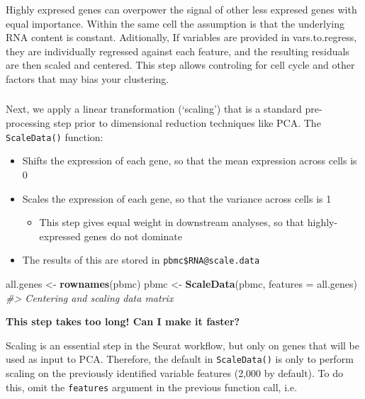 \documentclass[
]{book}
\newenvironment{Shaded}{\begin{snugshade}}{\end{snugshade}}
\newcommand{\AttributeTok}[1]{\textcolor[rgb]{0.13,0.29,0.53}{#1}}
\newcommand{\CommentTok}[1]{\textcolor[rgb]{0.56,0.35,0.01}{\textit{#1}}}
\newcommand{\FunctionTok}[1]{\textcolor[rgb]{0.13,0.29,0.53}{\textbf{#1}}}
\newcommand{\NormalTok}[1]{#1}
\newcommand{\OtherTok}[1]{\textcolor[rgb]{0.56,0.35,0.01}{#1}}
\providecommand{\tightlist}{%
  \setlength{\itemsep}{0pt}\setlength{\parskip}{0pt}}
\begin{document}
Highly expresed genes can overpower the signal of other less expresed genes with equal importance. Within the same cell the assumption is that the underlying RNA content is constant. Aditionally, If variables are provided in vars.to.regress, they are individually regressed against each feature, and the resulting residuals are then scaled and centered.
This step allows controling for cell cycle and other factors that may bias your clustering.

\subsubsection*{}\label{section-5}

Next, we apply a linear transformation (`scaling') that is a standard pre-processing step prior to dimensional reduction techniques like PCA. The \texttt{ScaleData()} function:

\begin{itemize}
\tightlist
\item
  Shifts the expression of each gene, so that the mean expression across cells is 0
\item
  Scales the expression of each gene, so that the variance across cells is 1

  \begin{itemize}
  \tightlist
  \item
    This step gives equal weight in downstream analyses, so that highly-expressed genes do not dominate
  \end{itemize}
\item
  The results of this are stored in \texttt{pbmc\$RNA@scale.data}
\end{itemize}

\begin{Shaded}
\begin{Highlighting}[]
\NormalTok{all.genes }\OtherTok{\textless{}{-}} \FunctionTok{rownames}\NormalTok{(pbmc)}
\NormalTok{pbmc }\OtherTok{\textless{}{-}} \FunctionTok{ScaleData}\NormalTok{(pbmc, }\AttributeTok{features =}\NormalTok{ all.genes)}
\CommentTok{\#\textgreater{} Centering and scaling data matrix}
\end{Highlighting}
\end{Shaded}

\textbf{This step takes too long! Can I make it faster?}

Scaling is an essential step in the Seurat workflow, but only on genes that will be used as input to PCA. Therefore, the default in \texttt{ScaleData()} is only to perform scaling on the previously identified variable features (2,000 by default). To do this, omit the \texttt{features} argument in the previous function call, i.e.
\end{document}
